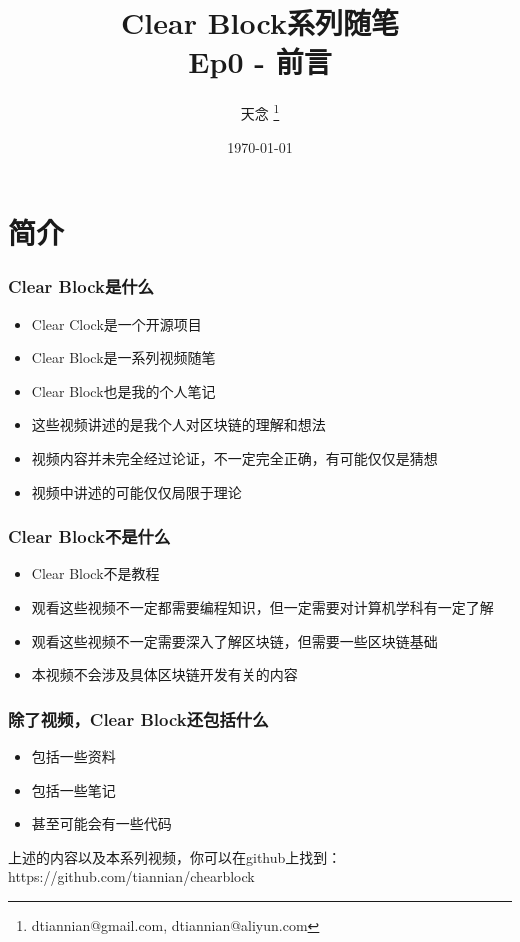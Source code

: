 \documentclass{beamer}
\title{Clear Block系列随笔 \\ Ep0 - 前言}
\author{天念 \thanks{dtiannian@gmail.com, dtiannian@aliyun.com}}
\date{\today}
\begin{document}
\begin{frame}
    \titlepage
\end{frame}

\section{简介}
\begin{frame}
    \frametitle{Clear Block是什么}
    \begin{itemize}
        \item Clear Clock是一个开源项目
        \item Clear Block是一系列视频随笔
        \item Clear Block也是我的个人笔记
        \item 这些视频讲述的是我个人对区块链的理解和想法
        \item 视频内容并未完全经过论证，不一定完全正确，有可能仅仅是猜想
        \item 视频中讲述的可能仅仅局限于理论
    \end{itemize}
\end{frame}

\begin{frame}
    \frametitle{Clear Block不是什么}
    \begin{itemize}
        \item Clear Block不是教程
        \item 观看这些视频不一定都需要编程知识，但一定需要对计算机学科有一定了解
        \item 观看这些视频不一定需要深入了解区块链，但需要一些区块链基础
        \item 本视频不会涉及具体区块链开发有关的内容
    \end{itemize}
\end{frame}

\begin{frame}
    \frametitle{除了视频，Clear Block还包括什么}
    \begin{itemize}
        \item 包括一些资料
        \item 包括一些笔记
        \item 甚至可能会有一些代码
    \end{itemize}
    上述的内容以及本系列视频，你可以在github上找到： \\
    https://github.com/tiannian/chearblock
\end{frame}


\end{document}
